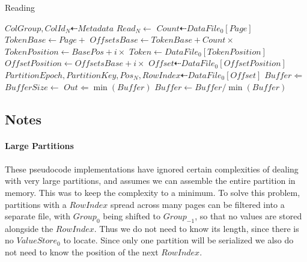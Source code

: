 \documentclass[fleqn]{article}
\begin{document}
\begin{algorithm}
\scriptsize
\caption{Reading}
\begin{algorithmic}[2]
\State $ColGroup, ColId_N \dashleftarrow Metadata$
\State $Read_N \gets $ 
 \State $Count \dashleftarrow DataFile_{0}[Page]$
 \State $TokenBase \gets Page +  $ 
 \State $OffsetsBase \gets TokenBase + Count \times $
  \State $TokenPosition \gets BasePos + i \times $ 
  \State $Token \gets DataFile_0[TokenPosition]$
   \State $OffsetPosition \gets OffsetsBase + i \times $ 
   \State $Offset \dashleftarrow DataFile_{0}[OffsetPosition]$
   \State $PartitionEpoch, PartitionKey, Pos_N, RowIndex \dashleftarrow DataFile_{0}[Offset]$
   \State $Buffer \Leftarrow $ 
   \State $BufferSize \gets $ 
    \State $Out \Leftarrow \min(Buffer)$
    \State $Buffer \gets Buffer / {\min(Buffer)}$
   \EndIf
  \EndIf
 \EndFor
\EndFor
\EndProcedure
\end{algorithmic}
\end{algorithm}

\clearpage
\subsection{Notes}
\small
\paragraph{Large Partitions}
\paragraph{}
    These pseudocode implementations have ignored certain complexities of dealing with very large
    partitions, and assumes we can assemble the entire partition in memory. This was to keep
    the complexity to a minimum. To solve this problem,
    partitions with a $RowIndex$ spread across many pages can be filtered into a separate
    file, with $Group_0$ being shifted to $Group_{-1}$, so that no values are stored alongside
    the $RowIndex$. Thus we do not need to know its length, since there is no $ValueStore_0$ to locate.
    Since only one partition will be serialized we also do not need to know the position of the next $RowIndex$.
\end{document}
